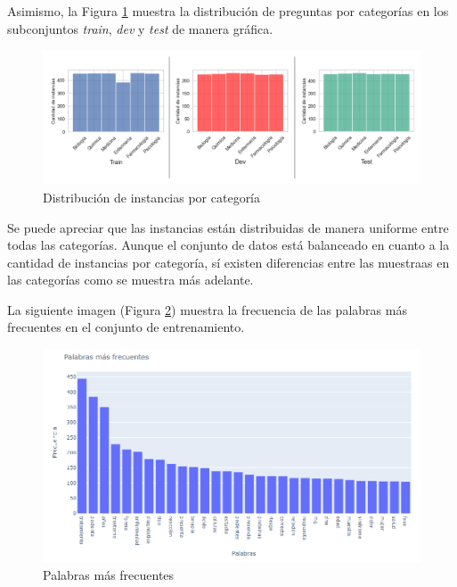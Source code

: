 Asimismo, la Figura \ref{train_dev_test} muestra la distribución de preguntas por categorías en los subconjuntos \textit{train}, \textit{dev} y \textit{test} de manera gráfica.

\begin{figure}[!tb]
  \begin{center}
    \includegraphics[angle=0, width=1\textwidth]{Graphics/train_dev_test.png}
  \end{center}
    \caption{Distribución de instancias por categoría}\label{train_dev_test}
\end{figure}

Se puede apreciar que las instancias están distribuidas de manera uniforme entre todas las categorías. Aunque el conjunto de datos está balanceado en cuanto a la cantidad de instancias por categoría, sí existen diferencias entre las muestraas en las categorías como se muestra más adelante.

La siguiente imagen (Figura \ref{words}) muestra la frecuencia de las palabras más frecuentes en el conjunto de entrenamiento.

\begin{figure}[!tb]
  \begin{center}
    \includegraphics[angle=0, width=1\textwidth]{Graphics/words.png}
  \end{center}
    \caption{Palabras más frecuentes}\label{words}
\end{figure}

